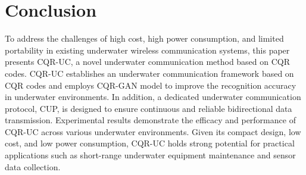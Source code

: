 \documentclass[preprint,12pt]{elsarticle}
\begin{document}
\section{Conclusion}
To address the challenges of high cost, high power consumption, and limited portability in existing underwater wireless communication systems, this paper presents CQR-UC, a novel underwater communication method based on CQR codes. CQR-UC establishes an underwater communication framework based on CQR codes and employs CQR-GAN model to improve the recognition accuracy in underwater environments. In addition, a dedicated underwater communication protocol, CUP, is designed to ensure continuous and reliable bidirectional data transmission. Experimental results demonstrate the efficacy and performance of CQR-UC across various underwater environments. Given its compact design, low cost, and low power consumption, CQR-UC holds strong potential for practical applications such as short-range underwater equipment maintenance and sensor data collection.



\end{document}
